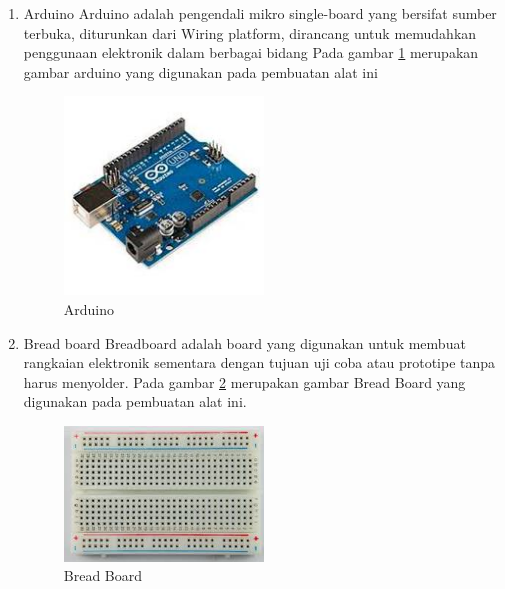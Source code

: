 \begin{enumerate}
\item Arduino
\subitem Arduino adalah pengendali mikro single-board yang bersifat sumber terbuka, diturunkan dari Wiring platform, dirancang untuk memudahkan penggunaan elektronik dalam berbagai bidang
 Pada gambar \ref{labelgambar1} merupakan gambar arduino yang digunakan pada pembuatan alat ini
	\begin{figure}[htbp]
	\centering
	\includegraphics[width=0.5\textwidth]{figures/ALAT_PENDETEKSI_BANJIR/arduino1c}
	\caption{Arduino}
	\label{labelgambar1}
	\end{figure}

\item Bread board
\subitem Breadboard adalah board yang digunakan untuk membuat rangkaian elektronik sementara dengan tujuan uji coba atau prototipe tanpa harus menyolder. Pada gambar \ref{labelgambar2} merupakan gambar Bread Board yang digunakan pada pembuatan alat ini.
	\begin{figure}[htbp]
	\centering
	\includegraphics[width=0.5\textwidth]{figures/ALAT_PENDETEKSI_BANJIR/bread_board_1c}
	\caption{Bread Board}
	\label{labelgambar2}
	\end{figure}


\end{enumerate}
